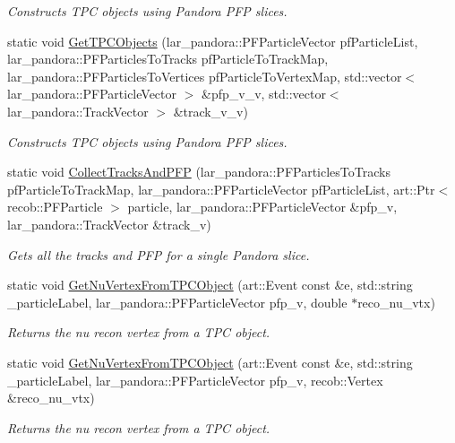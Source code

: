 \begin{DoxyCompactItemize}
\begin{DoxyCompactList}\small\item\em Constructs T\-P\-C objects using Pandora P\-F\-P slices. \end{DoxyCompactList}\item 
static void \hyperlink{classUBXSecHelper_a900fbd13023a46b8d3c0a38aae84a10b}{Get\-T\-P\-C\-Objects} (lar\-\_\-pandora\-::\-P\-F\-Particle\-Vector pf\-Particle\-List, lar\-\_\-pandora\-::\-P\-F\-Particles\-To\-Tracks pf\-Particle\-To\-Track\-Map, lar\-\_\-pandora\-::\-P\-F\-Particles\-To\-Vertices pf\-Particle\-To\-Vertex\-Map, std\-::vector$<$ lar\-\_\-pandora\-::\-P\-F\-Particle\-Vector $>$ \&pfp\-\_\-v\-\_\-v, std\-::vector$<$ lar\-\_\-pandora\-::\-Track\-Vector $>$ \&track\-\_\-v\-\_\-v)
\begin{DoxyCompactList}\small\item\em Constructs T\-P\-C objects using Pandora P\-F\-P slices. \end{DoxyCompactList}\item 
static void \hyperlink{classUBXSecHelper_ab441342f0c71741e353f323a26f27728}{Collect\-Tracks\-And\-P\-F\-P} (lar\-\_\-pandora\-::\-P\-F\-Particles\-To\-Tracks pf\-Particle\-To\-Track\-Map, lar\-\_\-pandora\-::\-P\-F\-Particle\-Vector pf\-Particle\-List, art\-::\-Ptr$<$ recob\-::\-P\-F\-Particle $>$ particle, lar\-\_\-pandora\-::\-P\-F\-Particle\-Vector \&pfp\-\_\-v, lar\-\_\-pandora\-::\-Track\-Vector \&track\-\_\-v)
\begin{DoxyCompactList}\small\item\em Gets all the tracks and P\-F\-P for a single Pandora slice. \end{DoxyCompactList}\item 
static void \hyperlink{classUBXSecHelper_a0ffc9245fc9813c18a1880d7e6f0aefe}{Get\-Nu\-Vertex\-From\-T\-P\-C\-Object} (art\-::\-Event const \&e, std\-::string \-\_\-particle\-Label, lar\-\_\-pandora\-::\-P\-F\-Particle\-Vector pfp\-\_\-v, double $\ast$reco\-\_\-nu\-\_\-vtx)
\begin{DoxyCompactList}\small\item\em Returns the nu recon vertex from a T\-P\-C object. \end{DoxyCompactList}\item 
static void \hyperlink{classUBXSecHelper_a092b41510117ee216ea323ea46695e1b}{Get\-Nu\-Vertex\-From\-T\-P\-C\-Object} (art\-::\-Event const \&e, std\-::string \-\_\-particle\-Label, lar\-\_\-pandora\-::\-P\-F\-Particle\-Vector pfp\-\_\-v, recob\-::\-Vertex \&reco\-\_\-nu\-\_\-vtx)
\begin{DoxyCompactList}\small\item\em Returns the nu recon vertex from a T\-P\-C object. \end{DoxyCompactList}\item 

\end{DoxyCompactItemize}
